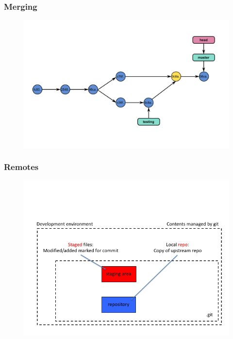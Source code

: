 \documentclass[11pt]{beamer}
\begin{document}
\begin{frame}[fragile]
\frametitle{Merging}
\begin{figure}[htp]
 \centering
 \includegraphics[scale=0.35]{branch6.png}
\end{figure}


\end{frame}




\begin{frame}[fragile]
\frametitle{Remotes}

\begin{figure}[htp]
 \centering
 \includegraphics[scale=0.35]{git_remotes_1.png}
\end{figure}

\end{frame}
\end{document}
